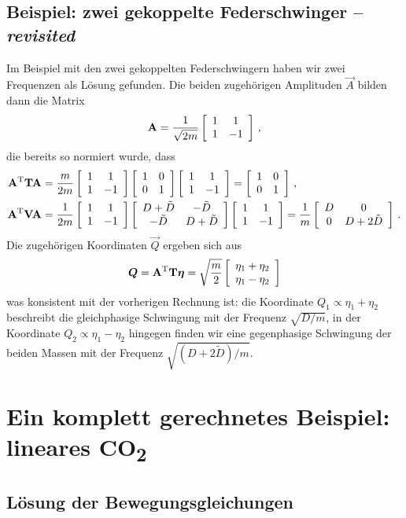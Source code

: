 \documentclass[paper=a4, fontsize=11.0pt, abstractoff, DIV12]{scrartcl}
\begin{document}
\subsection*{Beispiel: zwei gekoppelte Federschwinger -- \emph{revisited}}

Im Beispiel mit den zwei gekoppelten Federschwingern haben wir zwei Frequenzen
als Lösung gefunden. Die beiden zugehörigen Amplituden $\vec A$ bilden dann die
Matrix
\begin{equation}
\mathbf{A} = \frac{1}{\sqrt{2m}}\left[ \begin{array}{cc} 1 & 1 \\ 1 & -1 \end{array} \right]\, ,
\end{equation}
die bereits so normiert wurde, dass
\begin{align}
\mathbf{A}^\mathrm{T}\mathbf{T}\mathbf{A} &= \frac{m}{2m}\left[ \begin{array}{cc} 1 & 1 \\ 1 & -1 \end{array} \right]\left[ \begin{array}{cc} 1 & 0 \\ 0 & 1 \end{array} \right]\left[ \begin{array}{cc} 1 & 1 \\ 1 & -1 \end{array} \right] = \left[ \begin{array}{cc} 1 & 0 \\ 0 & 1 \end{array} \right]\, ,\\
\mathbf{A}^\mathrm{T}\mathbf{V}\mathbf{A} &= \frac{1}{2m}\left[ \begin{array}{cc} 1 & 1 \\ 1 & -1 \end{array} \right]\left[ \begin{array}{cc} D+\tilde D & -\tilde D \\ -\tilde D & D+\tilde D \end{array} \right]\left[ \begin{array}{cc} 1 & 1 \\ 1 & -1 \end{array} \right] = \frac{1}{m}\left[ \begin{array}{cc} D & 0 \\ 0 & D+2\tilde D \end{array} \right]\, .
\end{align}
Die zugehörigen Koordinaten $\vec Q$ ergeben sich aus
\begin{align}
{\ensuremath{\boldsymbol{Q}}} = \mathbf{A}^\mathrm{T} \mathbf{T} {\boldsymbol{\eta}} = \sqrt{\frac{m}{2}}\left[ \begin{array}{c} \eta_1 + \eta_2 \\ \eta_1-\eta_2 \end{array} \right]
\end{align}
was konsistent mit der vorherigen Rechnung ist: die Koordinate $Q_1 \propto \eta_1 + \eta_2$
beschreibt die gleichphasige Schwingung mit der Frequenz $\sqrt{D/m}$, in der
Koordinate $Q_2 \propto \eta_1 - \eta_2$ hingegen finden wir eine gegenphasige
Schwingung der beiden Massen mit der Frequenz $\sqrt{(D+2\tilde D)/m}$.

\section{Ein komplett gerechnetes Beispiel: lineares CO\textsubscript{2}}

\subsection{Lösung der Bewegungsgleichungen}
\end{document}
